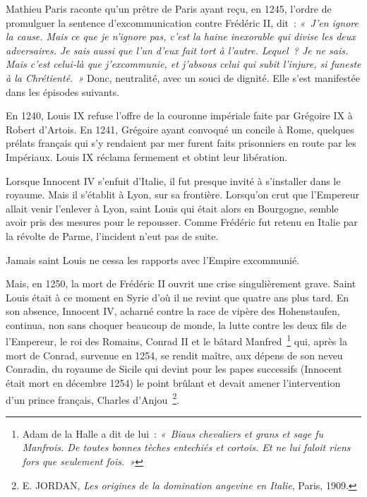\documentclass[french,twoside]{book} %
\begin{document}
\noindent Mathieu Paris raconte qu’un prêtre de Paris ayant reçu, en 1245, l’ordre de promulguer la sentence d’excommunication contre Frédéric II, dit : \emph{« J’en ignore la cause. Mais ce que je n’ignore pas, c’est la haine inexorable qui divise les deux adversaires. Je sais aussi que l’un d’eux fait tort à l’autre. Lequel ? Je ne sais. Mais c’est celui-là que j’excommunie, et j’absous celui qui subit l’injure, si funeste à la Chrétienté. »} Donc, neutralité, avec un souci de dignité. Elle s’est manifestée dans les épisodes suivants.\par
En 1240, Louis IX refuse l’offre de la couronne impériale faite par Grégoire IX à Robert d’Artois. En 1241, Grégoire ayant convoqué un concile à Rome, quelques prélats français qui s’y rendaient par mer furent faits prisonniers en route par les Impériaux. Louis IX réclama fermement et obtint leur libération.\par
Lorsque Innocent IV s’enfuit d’Italie, il fut presque invité à s’installer dans le royaume. Mais il s’établit à Lyon, sur sa frontière. Lorsqu’on crut que l’Empereur allait venir l’enlever à Lyon, saint Louis qui était alors en Bourgogne, semble avoir pris des mesures pour le repousser. Comme Frédéric fut retenu en Italie par la révolte de Parme, l’incident n’eut pas de suite.\par
Jamais saint Louis ne cessa les rapports avec l’Empire excommunié.\par
Mais, en 1250, la mort de Frédéric II ouvrit une crise singulièrement grave. Saint Louis était à ce moment en Syrie d’où il ne revint que quatre ans plus tard. En son absence, Innocent IV, acharné contre la race de vipère des Hohenstaufen, continua, non sans choquer beaucoup de monde, la lutte contre les deux fils de  
\label{p31} l’Empereur, le roi des Romains, Conrad II et le bâtard Manfred \footnote{Adam de la Halle a dit de lui : \emph{« Biaus chevaliers et grans et sage fu Manfrois. De toutes bonnes tèches entechiés et cortois. Et ne lui faloit riens fors que seulement fois. »}} qui, après la mort de Conrad, survenue en 1254, se rendit maître, aux dépens de son neveu Conradin, du royaume de Sicile qui devint pour les papes successifs (Innocent était mort en décembre 1254) le point brûlant et devait amener l’intervention d’un prince français, Charles d’Anjou \footnote{ E. JORDAN, {\itshape Les origines de la domination angevine en Italie}, Paris, 1909.}.\par
\end{document}
